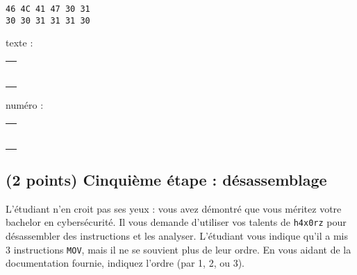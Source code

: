 \documentclass[11pt,a4paper]{article}
\begin{document}
\begin{table}[ht!]
  \centering
  \begin{minipage}{0.3\textwidth}
    \centering

\begin{lstlisting}[style=algorithmique]
46 4C 41 47 30 31
30 30 31 31 31 30
\end{lstlisting}

  \end{minipage}
  \hfillx
  \begin{minipage}{0.3\textwidth}
    \centering

texte :

\medskip

\begin{tabular}{ | m{2.5cm} | }
\hline
 \\ \\ \\ \\ \\ \\
\hline
\end{tabular}

  \end{minipage}
  \hfillx
  \begin{minipage}{0.3\textwidth}
    \centering

numéro :

\medskip

\begin{tabular}{ | m{2.5cm} | }
\hline
 \\ \\ \\ \\ \\ \\
\hline
\end{tabular}

  \end{minipage}
\end{table}


\subsection{(2 points) Cinquième étape : désassemblage }

L'étudiant n'en croit pas ses yeux : vous avez démontré que vous méritez votre bachelor en cybersécurité.
Il vous demande d'utiliser vos talents de \texttt{h4x0rz} pour désassembler des instructions et les analyser.
L'étudiant vous indique qu'il a mis 3 instructions \texttt{MOV}, mais il ne se souvient plus de leur ordre.
En vous aidant de la documentation fournie, indiquez l'ordre (par 1, 2, ou 3).
\end{document}
